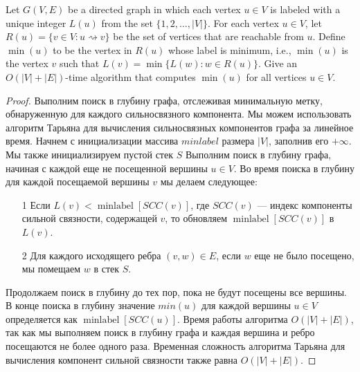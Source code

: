 \begin{prob}
Let $G(V, E)$ be a directed graph in which each vertex $u \in V$ is labeled with a unique integer $L(u)$ from the set $\{1,2, \ldots,|V|\}$. For each vertex $u \in V$, let $R(u)=\{v \in V: u \rightsquigarrow v\}$ be the set of vertices that are reachable from $u$. Define $\min (u)$ to be the vertex in $R(u)$ whose label is minimum, i.e., $\min (u)$ is the vertex $v$ such that $L(v)=\min \{L(w): w \in R(u)\}$. Give an $O(|V|+|E|)$-time algorithm that computes $\min (u)$ for all vertices $u \in V$.
\end{prob}
\vskip 0.2in
\begin{proof}
Выполним поиск в глубину графа, отслеживая минимальную метку, обнаруженную для каждого сильносвязного компонента. Мы можем использовать алгоритм Тарьяна для вычисления сильносвязных компонентов графа за линейное время.
\vskip 0.1in
Начнем с инициализации массива $minlabel$ размера $|V|$, заполнив его $+\infty$. Мы также инициализируем пустой стек $S$
\vskip 0.1in
Выполним поиск в глубину графа, начиная с каждой еще не посещенной вершины $u \in V$. Во время поиска в глубину для каждой посещаемой вершины $v$ мы делаем следующее:
\begin{itemize}
\item[1] Если $L(v) < \operatorname{minlabel}[SCC(v)]$, где $SCC(v)$ — индекс компоненты сильной связности, содержащей $v$, то обновляем $\operatorname{minlabel}[SCC(v)]$ в $L(v)$.
\item[2] Для каждого исходящего ребра $(v,w) \in E$, если $w$ еще не было посещено, мы помещаем $w$ в стек $S$.
\end{itemize}
Продолжаем поиск в глубину до тех пор, пока не будут посещены все вершины. В конце поиска в глубину значение $min(u)$ для каждой вершины $u \in V$ определяется как $\operatorname{minlabel}[SCC(u)]$.
\vskip 0.1in
Время работы алгоритма $O(|V|+|E|)$, так как мы выполняем поиск в глубину графа и каждая вершина и ребро посещаются не более одного раза. Временная сложность алгоритма Тарьяна для вычисления компонент сильной связности также равна $O(|V|+|E|)$.
\end{proof}
\vskip 0.6in

